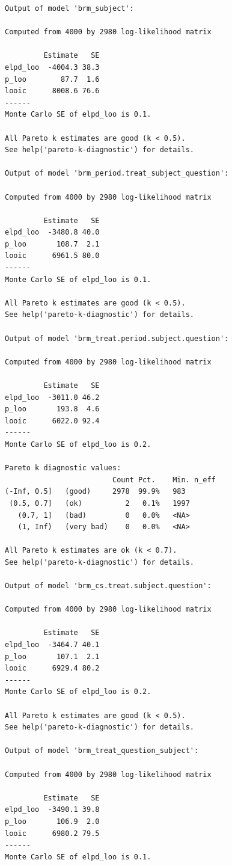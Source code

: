 \documentclass[
  12pt,
  a4paper,
  extrafontsizes,
  onecolumn,
  openright]{memoir}
\begin{document}
\begin{verbatim}
Output of model 'brm_subject':

Computed from 4000 by 2980 log-likelihood matrix

         Estimate   SE
elpd_loo  -4004.3 38.3
p_loo        87.7  1.6
looic      8008.6 76.6
------
Monte Carlo SE of elpd_loo is 0.1.

All Pareto k estimates are good (k < 0.5).
See help('pareto-k-diagnostic') for details.

Output of model 'brm_period.treat_subject_question':

Computed from 4000 by 2980 log-likelihood matrix

         Estimate   SE
elpd_loo  -3480.8 40.0
p_loo       108.7  2.1
looic      6961.5 80.0
------
Monte Carlo SE of elpd_loo is 0.1.

All Pareto k estimates are good (k < 0.5).
See help('pareto-k-diagnostic') for details.

Output of model 'brm_treat.period.subject.question':

Computed from 4000 by 2980 log-likelihood matrix

         Estimate   SE
elpd_loo  -3011.0 46.2
p_loo       193.8  4.6
looic      6022.0 92.4
------
Monte Carlo SE of elpd_loo is 0.2.

Pareto k diagnostic values:
                         Count Pct.    Min. n_eff
(-Inf, 0.5]   (good)     2978  99.9%   983       
 (0.5, 0.7]   (ok)          2   0.1%   1997      
   (0.7, 1]   (bad)         0   0.0%   <NA>      
   (1, Inf)   (very bad)    0   0.0%   <NA>      

All Pareto k estimates are ok (k < 0.7).
See help('pareto-k-diagnostic') for details.

Output of model 'brm_cs.treat.subject.question':

Computed from 4000 by 2980 log-likelihood matrix

         Estimate   SE
elpd_loo  -3464.7 40.1
p_loo       107.1  2.1
looic      6929.4 80.2
------
Monte Carlo SE of elpd_loo is 0.2.

All Pareto k estimates are good (k < 0.5).
See help('pareto-k-diagnostic') for details.

Output of model 'brm_treat_question_subject':

Computed from 4000 by 2980 log-likelihood matrix

         Estimate   SE
elpd_loo  -3490.1 39.8
p_loo       106.9  2.0
looic      6980.2 79.5
------
Monte Carlo SE of elpd_loo is 0.1.


\end{verbatim}
\end{document}
